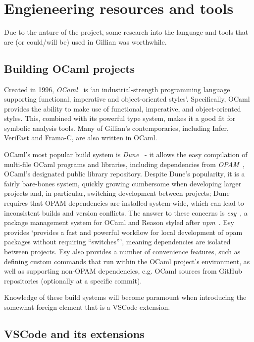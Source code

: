 \section{Engieneering resources and tools}

Due to the nature of the project, some research into the language and tools that
are (or could/will be) used in Gillian was worthwhile.

\subsection{Building OCaml projects}

Created in 1996, \textit{OCaml}~\cite{ocaml} is `an industrial-strength
programming language supporting functional, imperative and object-oriented
styles'. Specifically, OCaml provides the ability to make use of functional,
imperative, and object-oriented styles. This, combined with its powerful type
system, makes it a good fit for symbolic analysis tools. Many of Gillian's
contemporaries, including Infer, VeriFast and Frama-C, are also written in OCaml.

OCaml's most popular build system is \textit{Dune}~\cite{dune} - it allows the
easy compilation of multi-file OCaml programs and libraries, including
dependencies from \textit{OPAM}~\cite{opam}, OCaml's designated public library
repository. Despite Dune's popularity, it is a fairly bare-bones system, quickly
growing cumbersome when developing larger projects and, in particular,
switching development between projects; Dune requires that OPAM dependencies
are installed system-wide, which can lead to inconsistent builds and version
conflicts. The answer to these concerns is \textit{esy}~\cite{esy}, a package
management system for OCaml and Reason styled after \textit{npm}~\cite{npm}.
Esy provides `provides a fast and powerful workflow for local development of
opam packages without requiring ``switches''', meaning dependencies are isolated
between projects. Esy also provides a number of convenience features, such as
defining custom commands that run within the OCaml project's environment, as
well as supporting non-OPAM dependencies, e.g. OCaml sources from GitHub
repositories (optionally at a specific commit).

Knowledge of these build systems will become paramount when introducing the
somewhat foreign element that is a VSCode extension.


\subsection{VSCode and its extensions}
\label{sec:vscode}

